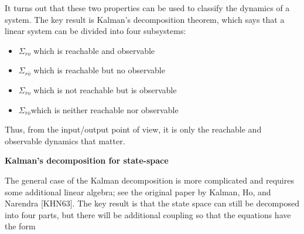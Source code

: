 It turns out that these two properties can be used to classify the dynamics of a system. The key
result is Kalman’s decomposition theorem, which says that a linear system can be
divided into four subsystems:

\begin{itemize}
\item $\Sigma_{ro}$ which is reachable and observable
\item $\Sigma_{r\bar{o}}$ which is reachable but no observable 
\item $\Sigma_{\bar{r}o}$ which is not reachable but is observable
\item $\Sigma_{\bar{r}\bar{o}}$which is neither reachable nor observable
\end{itemize}


Thus, from the input/output point of view, it is only the reachable and observable
dynamics that matter.

\begin{framed}
\theoremstyle{remark}
\begin{remark}{\textbf{Kalman's decomposition for state-space}}

The general case of the Kalman decomposition is more complicated and requires some additional linear algebra; 
see the original paper by Kalman, Ho, and Narendra [KHN63]. The key result is that the state space can still be decomposed
into four parts, but there will be additional coupling so that the equations have the form 
\end{remark}
\end{framed}


